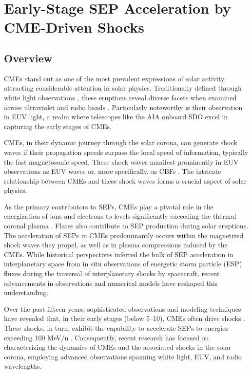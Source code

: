 \section{Early-Stage SEP Acceleration by CME-Driven Shocks}
\subsection{Overview}
CMEs stand out as one of the most prevalent expressions of solar activity, attracting considerable attention in solar physics. Traditionally defined through white light observations \citep{vourlidas_2003, zhang_2006, bein_2011}, these eruptions reveal diverse facets when examined across ultraviolet and radio bands \citep{bastian_2001, veronig_2010}. Particularly noteworthy is their observation in EUV light, a realm where telescopes like the AIA onboard SDO \citep{lemen_2012, pesnell_2012} excel in capturing the early stages of CMEs.

CMEs, in their dynamic journey through the solar corona, can generate shock waves if their propagation speeds surpass the local speed of information, typically the fast magnetosonic speed. These shock waves manifest prominently in EUV observations as EUV waves or, more specifically, as CBFs \citep{thompson_1998, long_2011}. The intricate relationship between CMEs and these shock waves forms a crucial aspect of solar physics.

As the primary contributors to SEPs, CMEs play a pivotal role in the energization of ions and electrons to levels significantly exceeding the thermal coronal plasma \citep{reames_1999}. Flares also contribute to SEP production during solar eruptions. The acceleration of SEPs in CMEs predominantly occurs within the magnetized shock waves they propel, as well as in plasma compressions induced by the CMEs. While historical perspectives inferred the bulk of SEP acceleration in interplanetary space from in situ observations of energetic storm particle (ESP) fluxes during the traversal of interplanetary shocks by spacecraft, recent advancements in observations and numerical models have reshaped this understanding.

Over the past fifteen years, sophisticated observations and modeling techniques have revealed that, in their early stages (below 5–10\rsun), CMEs often drive shocks \citep{ontiveross_2009, gopalswamy_2011}. These shocks, in turn, exhibit the capability to accelerate SEPs to energies exceeding 100 MeV/n \citep{battarbee_2013, kozarev_2013, schwadron_2014, kong_2017}. Consequently, recent research has focused on characterizing the dynamics of CMEs and the associated shocks in the solar corona, employing advanced observations spanning white light, EUV, and radio wavelengths.

